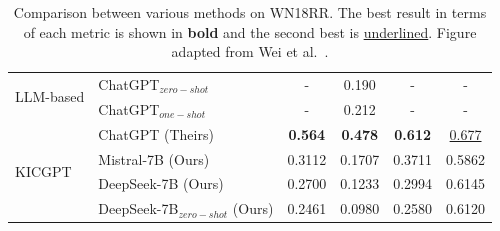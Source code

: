 \documentclass[12pt,a4paper]{article}
\begin{document}
\begin{table}
\begin{tabular}{l|l|c|c|c|c|}
        \multirow{2}{*}{LLM-based}
        & ChatGPT$_{zero-shot}$~\cite{zhu2023llms} & -                 & 0.190             & -                 & -                 \\
        & ChatGPT$_{one-shot}$~\cite{zhu2023llms}  & -                 & 0.212             & -                 & -                 \\

        \midrule

        \multirow{4}{*}{KICGPT}
        & ChatGPT (Theirs)                         & \textbf{0.564}    & \textbf{0.478}    & \textbf{0.612}    & \underline{0.677} \\
        & Mistral-7B (Ours)                        & 0.3112            & 0.1707            & 0.3711            & 0.5862            \\
        & DeepSeek-7B (Ours)                       & 0.2700            & 0.1233            & 0.2994            & 0.6145            \\
        & DeepSeek-7B$_{zero-shot}$ (Ours)         & 0.2461            & 0.0980            & 0.2580            & 0.6120            \\

        \bottomrule
    \end{tabular}

    \caption{Comparison between various methods on WN18RR. The best result in terms of each metric is shown in \textbf{bold} and the second best is \underline{underlined}. Figure adapted from Wei et al.~\cite{wei2023kicgpt}.}
    \label{tab:kicgpt_detailed_comparison}
\end{table}
\end{document}
